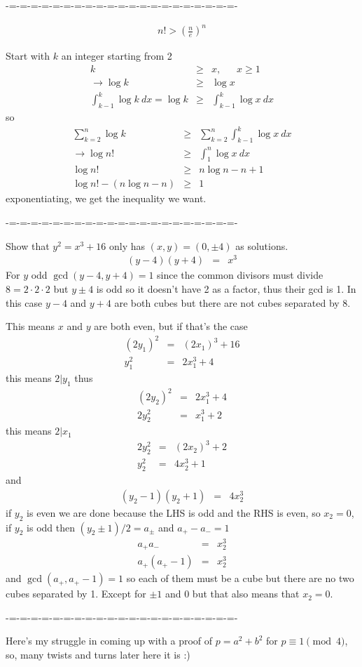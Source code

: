 \documentclass[aps,preprint,preprintnumbers,nofootinbib,showpacs,prd]{revtex4-1}
\newcommand{\nbea}{\begin{eqnarray*}}
\newcommand{\neea}{\end{eqnarray*}}
\begin{document}
-=-=-=-=-=-=-=-=-=-=-=-=-=-=-=-=-=-=-=-=-=-

%
\nbea
n! > \left(\frac{n}{e}\right)^n
\neea
%

Start with $k$ an integer starting from 2
%
\nbea
k & \ge & x, ~~~~~~~ x \ge 1 \\
\to \log k & \ge & \log x \\
\int_{k-1}^{k} \log k~ dx = \log k & \ge & \int_{k-1}^{k} \log x~ dx
\neea
%
so
%
\nbea
\sum_{k=2}^n \log k & \ge & \sum_{k=2}^n \int_{k-1}^{k} \log x~ dx \\
\to \log n! & \ge & \int_1^n \log x~dx \\
\log n! & \ge & n \log n - n + 1 \\
\log n! - (n\log n - n) & \ge & 1
\neea
%
exponentiating, we get the inequality we want.


-=-=-=-=-=-=-=-=-=-=-=-=-=-=-=-=-=-=-=-=-=-

Show that $y^2 = x^3 + 16$ only has $(x,y) = (0,\pm 4)$ as solutions.
%
\nbea
(y - 4)(y + 4) & = & x^3
\neea
%
For $y$ odd $\gcd(y-4,y+4) = 1$ since the common divisors must divide $8 = 2\cdot2\cdot2$ but $y \pm 4$ is odd so it doesn't have 2 as a factor, thus their gcd is 1. In this case $y-4$ and $y+4$ are both cubes but there are not cubes separated by 8.

This means $x$ and $y$ are both even, but if that's the case
%
\nbea
(2y_1)^2 & = & (2x_1)^3 + 16 \\
y_1^2 & = & 2x_1^3 + 4 
\neea
%
this means $2|y_1$ thus
%
\nbea
(2 y_2)^2 & = & 2x_1^3 + 4 \\
2y_2^2 & = & x_1^3 + 2
\neea
%
this means $2|x_1$
%
\nbea
2y_2^2 & = & (2x_2)^3 + 2 \\
y_2^2 & = & 4x_2^3 + 1
\neea
%
and
%
\nbea
(y_2 - 1)(y_2 + 1) & = & 4x_2^3
\neea
%
if $y_2$ is even we are done because the LHS is odd and the RHS is even, so $x_2 = 0$, if $y_2$ is odd then $(y_2\pm1)/2 = a_{\pm}$ and $a_+ - a_- = 1$
%
\nbea
a_+a_- & = & x_2^3 \\
a_+(a_+ - 1) & = & x_2^3
\neea
%
and $\gcd(a_+,a_+ - 1) = 1$ so each of them must be a cube but there are no two cubes separated by 1. Except for $\pm1$ and $0$ but that also means that $x_2 = 0$.

-=-=-=-=-=-=-=-=-=-=-=-=-=-=-=-=-=-=-=-=-=-

Here's my struggle in coming up with a proof of $p = a^2 + b^2$ for $p \equiv 1 \pmod{4}$, so, many twists and turns later here it is :)
\end{document}
